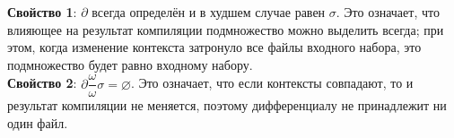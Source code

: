 \textbf{Свойство 1}: $\partial$ всегда определён и в худшем случае равен $\sigma$. Это означает, что влияющее на результат компиляции подмножество можно выделить всегда; при этом, когда изменение контекста затронуло все файлы входного набора, это подмножество будет равно входному набору.\\

\textbf{Свойство 2}: $\partial\dfrac{\omega}{\omega}\sigma = \varnothing$. Это означает, что если контексты совпадают, то и результат компиляции не меняется, поэтому дифференциалу не принадлежит ни один файл.\\

\begin{comment}
	Вопрос: верно ли, что в условиях инкрементального случая (там, где $\Delta^\rho_\alpha\sigma$)

	$$\partial\dfrac{\omega_\rho}{\omega_\alpha}(\sigma\setminus\rho)\subseteq\xi$$ ?

	\textbf{Доказательство:}

	\newcommand{\mypart}{\partial\dfrac{\omega_\rho}{\omega_\alpha}(\sigma\setminus\rho)}

	Докажем, что если $s \in \sigma\setminus\rho$, $s \notin \xi$, то $s \notin \mypart$. Обозначим $\tau = (\sigma\setminus\rho)\setminus\mypart$, тогда $\tau$ --- наибольшее подмножество $\sigma\setminus\rho$, такое, что $gen(\omega_\rho, \tau)$ определено $\Leftrightarrow$ $gen(\omega_\alpha, \tau)$ определено. Предположим, $s \in \mypart$, тогда $s \notin \tau$. Рассмотрим $gen(\omega_\rho, \tau)$.
\end{comment}

